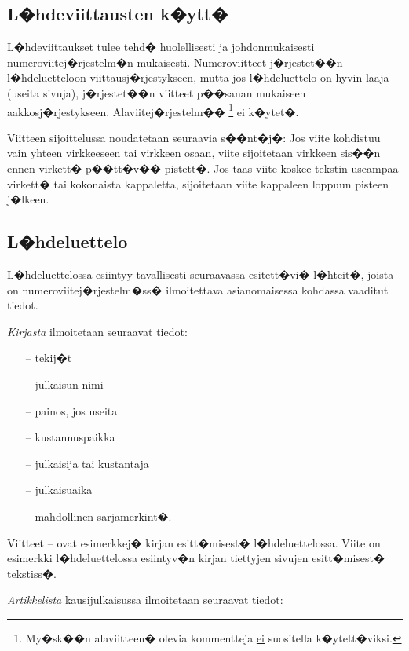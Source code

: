 \documentclass[finnish,12pt,a4paper,pdftex]{article}
\begin{document}
\subsection*{L�hdeviittausten k�ytt�} 

L�hdeviittaukset tulee tehd� huolellisesti ja johdonmukaisesti
numeroviitej�rjestelm�n mukaisesti. Numeroviitteet j�rjestet��n
l�hdeluetteloon viittausj�rjestykseen, mutta jos l�hdeluettelo
on hyvin laaja (useita sivuja), j�rjestet��n viitteet p��sanan 
mukaiseen aakkosj�rjestykseen. Alaviitej�rjestelm��
\footnote{My�sk��n alaviitteen� olevia kommentteja \underline{ei} suositella
k�ytett�viksi.} ei k�ytet�. 

Viitteen sijoittelussa noudatetaan seuraavia s��nt�j�:
Jos viite kohdistuu vain yhteen virkkeeseen tai virkkeen 
osaan, viite \cite{Kauranen} sijoitetaan virkkeen sis��n ennen virkett�
p��tt�v�� pistett�. Jos taas viite koskee tekstin useampaa
virkett� tai kokonaista kappaletta, sijoitetaan viite kappaleen loppuun 
pisteen j�lkeen. \cite{Kauranen} 

\subsection*{L�hdeluettelo} 

L�hdeluettelossa esiintyy tavallisesti seuraavassa esitett�vi�
l�hteit�, joista on numeroviitej�rjestelm�ss� ilmoitettava
asianomaisessa kohdassa vaaditut tiedot.

\textit{Kirjasta} ilmoitetaan seuraavat tiedot:

\begin{itemize}
\item[--]tekij�t 
\item[--]julkaisun nimi
\item[--]painos, jos useita
\item[--]kustannuspaikka
\item[--]julkaisija tai kustantaja
\item[--]julkaisuaika
\item[--]mahdollinen sarjamerkint�. 
\end{itemize}

Viitteet \cite{Kauranen}--\cite{Koblitz} ovat esimerkkej� kirjan
esitt�misest� l�hdeluettelossa. Viite \cite[s.\ 83--124]{Koblitz} on
esimerkki l�hdeluettelossa esiintyv�n kirjan tiettyjen sivujen
esitt�misest� tekstiss�.

\textit{Artikkelista} kausijulkaisussa ilmoitetaan seuraavat tiedot:
\end{document}
